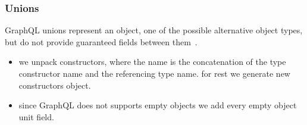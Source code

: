 \begin{frame}[allowframebreaks]\frametitle{Unions}

GraphQL unions represent an object, one of the possible alternative object types, but do not provide guaranteed fields between them~\cite{gql-spec}. 


\begin{itemize}
  \item we unpack constructors, where the name is the concatenation of the type constructor name and the referencing type name. for rest we generate new constructors object.
  \item since GraphQL does not supports empty objects we add every empty object unit field.
\end{itemize}


\end{frame}

